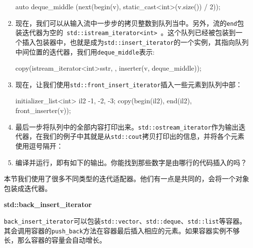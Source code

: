 \begin{enumerate}
\begin{codebox}[cpp]
auto deque_middle (next(begin(v),
     static_cast<int>(v.size()) / 2));
\end{codebox}

\item 现在，我们可以从输入流中一步步的拷贝整数到队列当中。另外，流的\texttt{end}包装迭代器为空的\texttt{ std::istream\_iterator<int> }。这个队列已经被包装到一个插入包装器中，也就是成为\texttt{std::insert\_iterator}的一个实例，其指向队列中间位置的迭代器，我们用\texttt{deque\_middle}表示:

\begin{codebox}[cpp]
    copy(istream_iterator<int>{sstr}, {}, inserter(v, deque_middle));
\end{codebox}

\item 现在，让我们使用\texttt{std::front\_insert\_iterator}插入一些元素到队列中部：

\begin{codebox}[cpp]
initializer_list<int> il2 {-1, -2, -3};
copy(begin(il2), end(il2), front_inserter(v));
\end{codebox}

\item 最后一步将队列中的全部内容打印出来。\texttt{std::ostream\_iterator}作为输出迭代器，在我们的例子中其就是从\texttt{std::cout}拷贝打印出的信息，并将各个元素使用逗号隔开：

\begin{codebox}[cpp]
    copy(begin(v), end(v), ostream_iterator<int>{cout, ", "});
    cout << '\n';
}
\end{codebox}

\item 编译并运行，即有如下的输出。你能找到那些数字是由哪行的代码插入的吗？


\end{enumerate}


本节我们使用了很多不同类型的迭代适配器。他们有一点是共同的，会将一个对象包装成迭代器。

\textbf{std::back\_insert\_iterator}

\texttt{back\_insert\_iterator}可以包装\texttt{std::vector}、\texttt{std::deque}、\texttt{std::list}等容器。其会调用容器的\texttt{push\_back}方法在容器最后插入相应的元素。如果容器实例不够长，那么容器的容量会自动增长。

